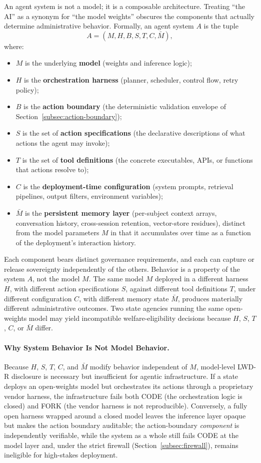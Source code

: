 \documentclass{article}
\theoremstyle{definition}
\begin{document}
An agent system is not a model; it is a composable architecture. Treating ``the AI'' as a synonym for ``the model weights'' obscures the components that actually determine administrative behavior. Formally, an agent system $A$ is the tuple
\[
A = (M, H, B, S, T, C, \bar{M}),
\]
where:
\begin{itemize}[noitemsep]
    \item $M$ is the underlying \textbf{model} (weights and inference logic);
    \item $H$ is the \textbf{orchestration harness} (planner, scheduler, control flow, retry policy);
    \item $B$ is the \textbf{action boundary} (the deterministic validation envelope of Section~\ref{subsec:action-boundary});
    \item $S$ is the set of \textbf{action specifications} (the declarative descriptions of what actions the agent may invoke);
    \item $T$ is the set of \textbf{tool definitions} (the concrete executables, APIs, or functions that actions resolve to);
    \item $C$ is the \textbf{deployment-time configuration} (system prompts, retrieval pipelines, output filters, environment variables);
    \item $\bar{M}$ is the \textbf{persistent memory layer} (per-subject context arrays, conversation history, cross-session retention, vector-store residues), distinct from the model parameters $M$ in that it accumulates over time as a function of the deployment's interaction history.
\end{itemize}

Each component bears distinct governance requirements, and each can capture or release sovereignty independently of the others. Behavior is a property of the system $A$, not the model $M$. The same model $M$ deployed in a different harness $H$, with different action specifications $S$, against different tool definitions $T$, under different configuration $C$, with different memory state $\bar{M}$, produces materially different administrative outcomes. Two state agencies running the same open-weights model may yield incompatible welfare-eligibility decisions because $H$, $S$, $T$, $C$, or $\bar{M}$ differ.

\paragraph{Why System Behavior Is Not Model Behavior.} Because $H$, $S$, $T$, $C$, and $\bar{M}$ modify behavior independent of $M$, model-level LWD-R disclosure is necessary but insufficient for agentic infrastructure. If a state deploys an open-weights model but orchestrates its actions through a proprietary vendor harness, the infrastructure fails both CODE (the orchestration logic is closed) and FORK (the vendor harness is not reproducible). Conversely, a fully open harness wrapped around a closed model leaves the inference layer opaque but makes the action boundary auditable; the action-boundary \emph{component} is independently verifiable, while the system as a whole still fails CODE at the model layer and, under the strict firewall (Section~\ref{subsec:firewall}), remains ineligible for high-stakes deployment.
\end{document}
